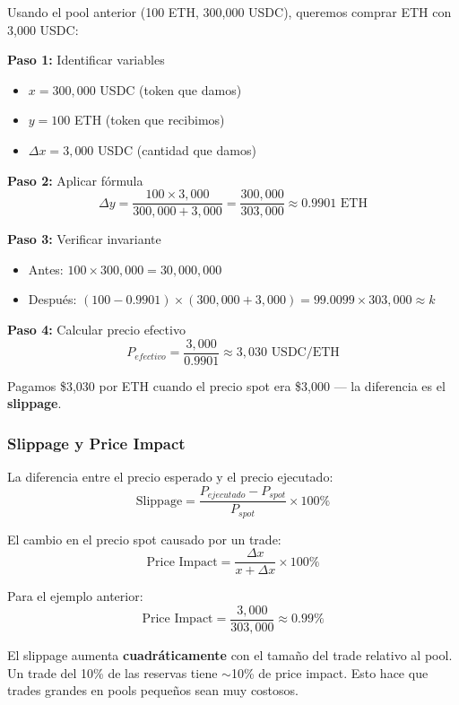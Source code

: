 \documentclass[11pt,a4paper,twoside]{book}
\begin{document}
\begin{example}
Usando el pool anterior (100 ETH, 300,000 USDC), queremos comprar ETH con 3,000 USDC:

\textbf{Paso 1:} Identificar variables
\begin{itemize}
    \item $x = 300,000$ USDC (token que damos)
    \item $y = 100$ ETH (token que recibimos)
    \item $\Delta x = 3,000$ USDC (cantidad que damos)
\end{itemize}

\textbf{Paso 2:} Aplicar f\'ormula
\[
\Delta y = \frac{100 \times 3,000}{300,000 + 3,000} = \frac{300,000}{303,000} \approx 0.9901 \text{ ETH}
\]

\textbf{Paso 3:} Verificar invariante
\begin{itemize}
    \item Antes: $100 \times 300,000 = 30,000,000$
    \item Despu\'es: $(100 - 0.9901) \times (300,000 + 3,000) = 99.0099 \times 303,000 \approx k$
\end{itemize}

\textbf{Paso 4:} Calcular precio efectivo
\[
P_{efectivo} = \frac{3,000}{0.9901} \approx 3,030 \text{ USDC/ETH}
\]

Pagamos \$3,030 por ETH cuando el precio spot era \$3,000 --- la diferencia es el \textbf{slippage}.
\end{example}

\subsubsection{Slippage y Price Impact}

\begin{definition}[Slippage]
La diferencia entre el precio esperado y el precio ejecutado:
\[
\text{Slippage} = \frac{P_{ejecutado} - P_{spot}}{P_{spot}} \times 100\%
\]
\end{definition}

\begin{definition}
El cambio en el precio spot causado por un trade:
\[
\text{Price Impact} = \frac{\Delta x}{x + \Delta x} \times 100\%
\]

Para el ejemplo anterior:
\[
\text{Price Impact} = \frac{3,000}{303,000} \approx 0.99\%
\]
\end{definition}

\begin{remark}
El slippage aumenta \textbf{cuadr\'aticamente} con el tama\~no del trade relativo al pool. Un trade del 10\% de las reservas tiene $\sim$10\% de price impact. Esto hace que trades grandes en pools peque\~nos sean muy costosos.
\end{remark}
\end{document}
